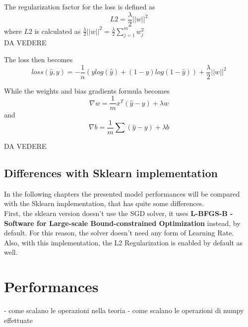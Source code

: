 \documentclass[
	letterpaper, %
	10pt, %
]{class}
\begin{document}
The regularization factor for the loss is defined as
$$ L2 = \frac{\lambda}{2}||w||^2 $$
where $L2$ is calculated as $ \frac{\lambda}{2}||w||^2 = \frac{\lambda}2{\displaystyle\sum_{j=1}^m w_j^2} $ \\
DA VEDERE

The loss then becomes
$$ loss(\hat{y}, y) = -\frac{1}{n}(y log(\hat{y}) + (1-y)log(1-\hat{y})) + \frac{\lambda}{2}||w||^2 $$

While the weights and bias gradients formula becomes
$$ \nabla w = \frac{1}{m}x^T(\hat{y} - y) + \lambda w $$
and
$$ \nabla b = \frac{1}{m}\sum(\hat{y} - y) + \lambda b$$

DA VEDERE

\subsection{Differences with Sklearn implementation}

In the following chapters the presented model performances will be compared with the Sklearn implementation, that has quite some differences.\\
First, the sklearn version doesn't use the SGD solver, it uses \textbf{L-BFGS-B - Software for Large-scale Bound-constrained Optimization} instead, by default.
For this reason, the solver doesn't need any form of Learning Rate.\\
Also, with this implementation, the L2 Regularization is enabled by default as well.




\section{Performances}

- come scalano le operazioni nella teoria
- come scalano le operazioni di numpy effettuate
\end{document}
